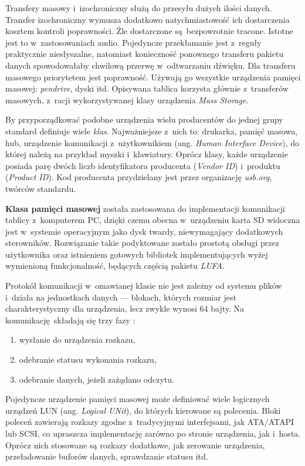 Transfery masowy i~izochroniczny służą do przesyłu dużych ilości danych. Transfer izochroniczny wymusza dodatkowo natychmiastowość ich dostarczenia kosztem kontroli poprawności. Źle dostarczone są bezpowrotnie tracone. Istotne jest to w~zastosowaniach audio. Pojedyncze przekłamanie jest z~reguły praktycznie niesłyszalne, natomiast konieczność ponownego transferu pakietu danych spowodowałaby chwilową przerwę w~odtwarzaniu dźwięku. Dla transferu masowego priorytetem jest poprawność. Używają go wszystkie urządzenia pamięci masowej: \textit{pendrive}, dyski itd. Opisywana tablica korzysta głównie z~transferów masowych, z~racji wykorzystywanej klasy urządzenia \textit{Mass Storage}.

By przyporządkować podobne urządzenia wielu producentów do jednej grupy standard definiuje wiele \textit{klas}. Najważniejsze z~nich to: drukarka, pamięć masowa, hub, urządzenie komunikacji z~użytkownikiem (ang. \textit{Human Interface Device}), do której należą na przykład myszki i~klawiatury. Oprócz klasy, każde urządzenie posiada parę dwóch liczb identyfikatora producenta (\textit{Vendor ID}) i~produktu (\textit{Product ID}). Kod producenta przydzielany jest przez organizację \textit{usb.org}, twórców standardu.

\textbf{Klasa pamięci masowej} została zastosowana do implementacji komunikacji tablicy z~komputerem PC, dzięki czemu obecna w~urządzeniu karta SD widoczna jest w~systemie operacyjnym jako dysk twardy, niewymagający dodatkowych sterowników. Rozwiązanie takie podyktowane zostało prostotą obsługi przez użytkownika oraz istnieniem gotowych bibliotek implementujących wyżej wymienioną funkcjonalność, będących częścią pakietu \textit{LUFA}.

Protokół komunikacji w~omawianej klasie nie jest zależny od systemu plików i~działa na jednostkach danych --- blokach, których rozmiar jest charakterystyczny dla urządzenia, lecz zwykle wynosi 64 bajty. Na komunikację składają się trzy fazy \cite{interfejsy}:

\begin{enumerate}
\item wysłanie do urządzenia rozkazu,
\item odebranie statusu wykonania rozkazu,
\item odebranie danych, jeżeli zażądano odczytu.
\end{enumerate}

Pojedyncze urządzenie pamięci masowej może definiować wiele logicznych urządzeń LUN (ang. \textit{Logical UNit}), do których kierowane są polecenia. Bloki poleceń zawierają rozkazy zgodne z~tradycyjnymi interfejsami, jak ATA/ATAPI lub SCSI, co upraszcza implementację zarówno po stronie urządzenia, jak i~hosta. Oprócz nich stosowane są rozkazy dodatkowe, jak zerowanie urządzenia, przeładowanie buforów danych, sprawdzanie statusu itd.


